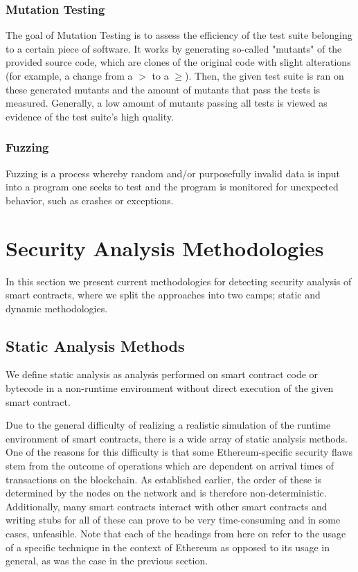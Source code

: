 \documentclass[letterpaper,twocolumn,10pt]{article}
\begin{document}
\subsubsection{Mutation Testing}
\label{subsection:mut}
The goal of Mutation Testing is to assess the efficiency of the test suite belonging to a certain piece of software. It works by generating so-called "mutants" of the provided source code, which are clones of the original code with slight alterations (for example, a change from a $>$ to a $\geq$). Then, the given test suite is ran on these generated mutants and the amount of mutants that pass the tests is measured. Generally, a low amount of mutants passing all tests is viewed as evidence of the test suite's high quality.

\subsubsection{Fuzzing}
Fuzzing is a process whereby random and/or purposefully invalid data is input into a program one seeks to test and the program is monitored for unexpected behavior, such as crashes or exceptions.

\section{Security Analysis Methodologies}
In this section we present current methodologies for detecting security analysis of smart contracts, where we split the approaches into two camps; static and dynamic methodologies.


\subsection{Static Analysis Methods}
We define static analysis as analysis performed on smart contract code or bytecode in a non-runtime environment without direct execution of the given smart contract.


Due to the general difficulty of realizing a realistic simulation of the runtime environment of smart contracts, there is a wide array of static analysis methods. One of the reasons for this difficulty is that some Ethereum-specific security flaws stem from the outcome of operations which are dependent on arrival times of transactions on the blockchain. As established earlier, the order of these is determined by the nodes on the network and is therefore non-deterministic. Additionally, many smart contracts interact with other smart contracts and writing stubs for all of these can prove to be very time-consuming and in some cases, unfeasible. Note that each of the headings from here on refer to the usage of a specific technique in the context of Ethereum as opposed to its usage in general, as was the case in the previous section.
\end{document}
